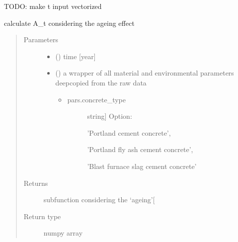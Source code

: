 \documentclass[letterpaper,10pt,english]{sphinxmanual}
\begin{document}
\sphinxAtStartPar
TODO: make t input vectorized

\begin{fulllineitems}
\label{\detokenize{chloride:chloride.A_t}}
\sphinxAtStartPar
calculate A\_t considering the ageing effect
\begin{quote}\begin{description}
\item[{Parameters}] \leavevmode\begin{itemize}
\item {} 
\sphinxAtStartPar
{} (\sphinxstyleliteralemphasis{\sphinxupquote{, }}) \textendash{} time {[}year{]}

\item {} 
\sphinxAtStartPar
{} () \textendash{} 
\sphinxAtStartPar
a wrapper of all material and environmental parameters deep\sphinxhyphen{}copied from the raw data
\begin{itemize}
\item {} \begin{description}
\item[{pars.concrete\_type}] \leavevmode{[}string{]}
\sphinxAtStartPar
Option:

\sphinxAtStartPar
’Portland cement concrete’,

\sphinxAtStartPar
’Portland fly ash cement concrete’,

\sphinxAtStartPar
’Blast furnace slag cement concrete’

\end{description}

\end{itemize}


\end{itemize}

\item[{Returns}] \leavevmode
\sphinxAtStartPar
{} \textendash{} subfunction considering the ‘ageing’{[}\sphinxhyphen{}{]}

\item[{Return type}] \leavevmode
\sphinxAtStartPar
numpy array


\end{description}
\end{quote}
\end{fulllineitems}
\end{document}
